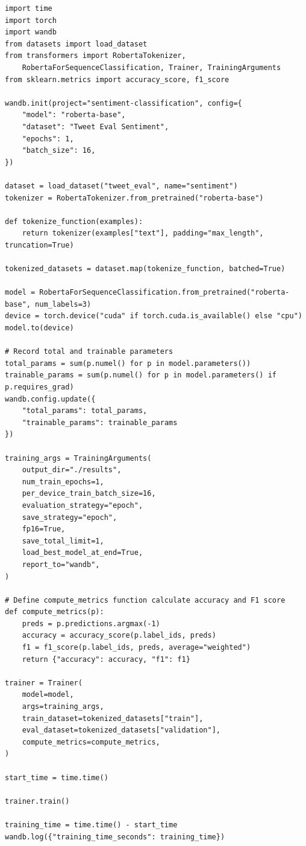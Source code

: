 \documentclass[11pt, oneside]{article}   	%
\begin{document}
\begin{verbatim}
import time
import torch
import wandb
from datasets import load_dataset
from transformers import RobertaTokenizer, 
    RobertaForSequenceClassification, Trainer, TrainingArguments
from sklearn.metrics import accuracy_score, f1_score

wandb.init(project="sentiment-classification", config={
    "model": "roberta-base",
    "dataset": "Tweet Eval Sentiment",
    "epochs": 1,
    "batch_size": 16,
})

dataset = load_dataset("tweet_eval", name="sentiment")
tokenizer = RobertaTokenizer.from_pretrained("roberta-base")

def tokenize_function(examples):
    return tokenizer(examples["text"], padding="max_length", truncation=True)

tokenized_datasets = dataset.map(tokenize_function, batched=True)

model = RobertaForSequenceClassification.from_pretrained("roberta-base", num_labels=3)
device = torch.device("cuda" if torch.cuda.is_available() else "cpu")
model.to(device)

# Record total and trainable parameters
total_params = sum(p.numel() for p in model.parameters())
trainable_params = sum(p.numel() for p in model.parameters() if p.requires_grad)
wandb.config.update({
    "total_params": total_params,
    "trainable_params": trainable_params
})

training_args = TrainingArguments(
    output_dir="./results",
    num_train_epochs=1,
    per_device_train_batch_size=16,
    evaluation_strategy="epoch",
    save_strategy="epoch",
    fp16=True, 
    save_total_limit=1,
    load_best_model_at_end=True,
    report_to="wandb",
)

# Define compute_metrics function calculate accuracy and F1 score
def compute_metrics(p):
    preds = p.predictions.argmax(-1)
    accuracy = accuracy_score(p.label_ids, preds)
    f1 = f1_score(p.label_ids, preds, average="weighted")
    return {"accuracy": accuracy, "f1": f1}

trainer = Trainer(
    model=model,
    args=training_args,
    train_dataset=tokenized_datasets["train"],
    eval_dataset=tokenized_datasets["validation"],
    compute_metrics=compute_metrics,
)

start_time = time.time()

trainer.train()

training_time = time.time() - start_time
wandb.log({"training_time_seconds": training_time})


\end{verbatim}
\end{document}
